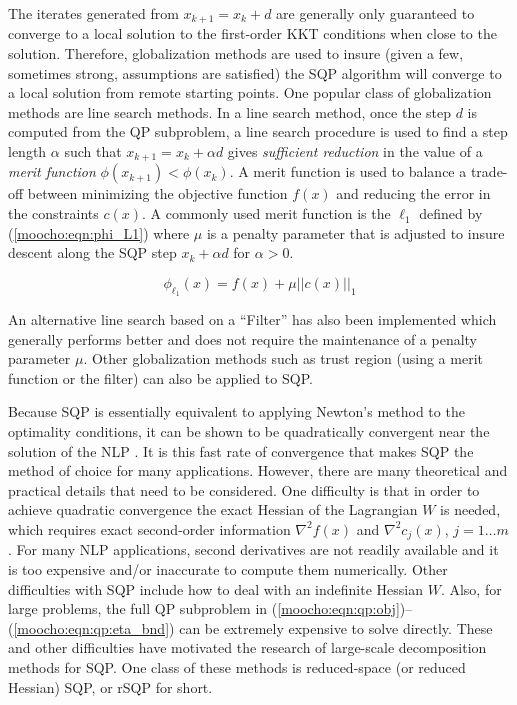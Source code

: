 \documentclass[pdf,ps2pdf,11pt]{SANDreport}
\begin{document}
{The iterates generated from $x_{k+1} = x_k + d$ are generally only
guaranteed to converge to a local solution to the first-order KKT
conditions when close to the solution.  Therefore, globalization
methods are used to insure (given a few, sometimes strong, assumptions
are satisfied) the SQP algorithm will converge to a local solution
from remote starting points.  One popular class of globalization
methods are line search methods.  In a line search method, once the
step $d$ is computed from the QP subproblem, a line search procedure
is used to find a step length $\alpha$ such that $x_{k+1} = x_k +
\alpha d$ gives {\em sufficient reduction} in the value of a
{\em merit function} $\phi(x_{k+1}) < \phi(x_k)$.  A merit function
is used to balance a trade-off between minimizing the objective
function $f(x)$ and reducing the error in the constraints $c(x)$.  A
commonly used merit function is the $\ell_1$ defined by
(\ref{moocho:eqn:phi_L1}) where $\mu$ is a penalty parameter that is
adjusted to insure descent along the SQP step $x_k + \alpha d$ for
$\alpha > 0$.

{\bsinglespace
\begin{equation}
\phi_{\ell_1}(x) = f(x) + \mu ||c(x)||_1
\label{moocho:eqn:phi_L1}
\end{equation}
\esinglespace}

An alternative line search based on a ``Filter'' has also been implemented which generally
performs better and does not require the maintenance of a penalty parameter $\mu$.
Other globalization methods such as trust region (using a merit function or the filter)
can also be applied to SQP.

Because SQP is essentially equivalent to applying Newton's method to
the optimality conditions, it can be shown to be quadratically
convergent near the solution of the NLP
\cite{ref:nocedal_overton_1985}.  It is this fast rate of convergence
that makes SQP the method of choice for many applications.  However,
there are many theoretical and practical details that need to be
considered.  One difficulty is that in order to achieve quadratic
convergence the exact Hessian of the Lagrangian $W$ is needed, which
requires exact second-order information $\nabla^2 f(x)$ and $\nabla^2
c_j(x)$, $j = 1 \ldots m$.  For many NLP applications, second
derivatives are not readily available and it is too expensive and/or
inaccurate to compute them numerically.  Other difficulties with SQP
include how to deal with an indefinite Hessian $W$.  Also, for large
problems, the full QP subproblem in
(\ref{moocho:eqn:qp:obj})--(\ref{moocho:eqn:qp:eta_bnd}) can be
extremely expensive to solve directly.  These and other difficulties
have motivated the research of large-scale decomposition methods for
SQP.  One class of these methods is reduced-space (or reduced Hessian)
SQP, or rSQP for short.

}
\end{document}
